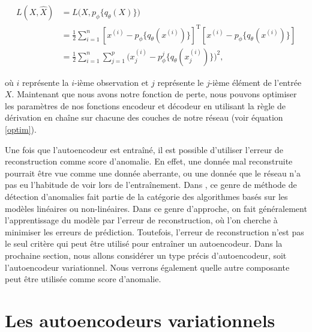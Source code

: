 \begin{equation} \label{perte1}
\begin{split}
L(X,\hat{X}) & = L\big(X, p_\phi\{q_\theta(X)\}\big) \\
& = \frac{1}{2} \sum_{i=1}^{n} [x^{(i)}-p_\phi\{q_\theta(x^{(i)})\}]^{\text{T}}[x^{(i)}-p_\phi\{q_\theta(x^{(i)})\}] \\
& = \frac{1}{2} \sum_{i=1}^{n} \sum_{j=1}^{p} \big(x_{j}^{(i)}-p^j_\phi\{q_\theta(x_{j}^{(i)})\}\big)^2,
\end{split}
\end{equation}

où $i$ représente la $i$-ième observation et $j$ représente le $j$-ième élément de l'entrée $X$. Maintenant que nous avons notre fonction de perte, nous pouvons optimiser les paramètres de nos fonctions encodeur et décodeur en utilisant la règle de dérivation en chaîne sur chacune des couches de notre réseau (voir équation \ref{optim}).

Une fois que l'autoencodeur est entraîné, il est possible d'utiliser l'erreur de reconstruction comme score d'anomalie. En effet, une donnée mal reconstruite pourrait être vue comme une donnée aberrante, ou une donnée que le réseau n'a pas eu l'habitude de voir lors de l'entraînement. Dans  \cite{10.5555/3086742}, ce genre de méthode de détection d'anomalies fait partie de la catégorie des algorithmes basés sur les modèles linéaires ou non-linéaires. Dans ce genre d'approche, on fait généralement l'apprentissage du modèle par l'erreur de reconstruction, où l'on cherche à minimiser les erreurs de prédiction. Toutefois, l'erreur de reconstruction n'est pas le seul critère qui peut être utilisé pour entraîner un autoencodeur. Dans la prochaine section, nous allons considérer un type précis d'autoencodeur, soit l'autoencodeur variationnel. Nous verrons également quelle autre composante peut être utilisée comme score d'anomalie.

\section{Les autoencodeurs variationnels} \label{background-vae}

